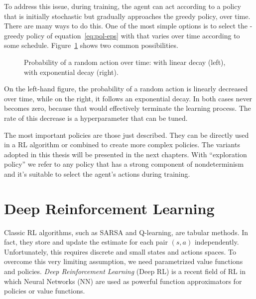 To address this issue, during training, the agent can act according to a
policy that is initially stochastic but gradually approaches the greedy
policy, over time. There are many ways to do this. One of the most simple
options is to select the \eps{}-greedy policy of equation~\eqref{eq:pol-eps}
with \eps{} that varies over time according to some schedule.
Figure~\ref{fig:policy-schedules} shows two common possibilities.
\begin{figure}
	\centering
	\qquad
	\caption{Probability of a random action over time: \eps{} with linear decay
	(left), \eps{} with exponential decay (right).}
	\label{fig:policy-schedules}
\end{figure}
On the left-hand figure, the probability of a random action is linearly
decreased over time, while on the right, it follows an exponential decay. In
both cases \eps{} never becomes zero, because that would effectively terminate
the learning process. The rate of this decrease is a hyperparameter that
can be tuned.

The most important policies are those just described. They can be directly
used in a RL algorithm or combined to create more complex policies.  The
variants adopted in this thesis will be presented in the next chapters.  With
``exploration policy'' we refer to any policy that has a strong component of
nondeterminism and it's suitable to select the agent's actions during
training.


\section{Deep Reinforcement Learning}

Classic RL algorithms, such as SARSA and Q-learning, are tabular methods.
In fact, they store and update the estimate for each pair $(s, a)$
independently. Unfortunately, this requires discrete and small states and
actions spaces. To overcome this very limiting assumption, we need
parametrized value functions and policies.  \emph{Deep Reinforcement Learning}
(Deep RL) is a recent field of RL in which Neural Networks (NN) are used as
powerful function approximators for policies or value functions.


